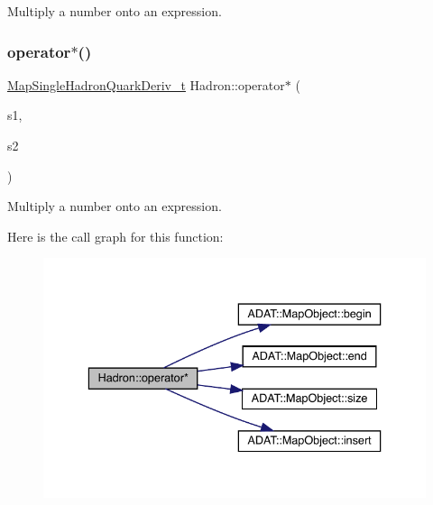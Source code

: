 Multiply a number onto an expression. 

\mbox{\label{namespaceHadron_aee77eafb416d7080a53fa0bd52528d11}} 
\subsubsection{\texorpdfstring{operator$\ast$()}{operator*()}\hspace{0.1cm}{\footnotesize\ttfamily [4/6]}}
{\footnotesize\ttfamily \mbox{\hyperlink{namespaceHadron_aa588220689caea8a6aad4d0296526e6b}{Map\+Single\+Hadron\+Quark\+Deriv\+\_\+t}} Hadron\+::operator$\ast$ (\begin{DoxyParamCaption}\item[{const std\+::complex$<$ double $>$ \&}]{s1,  }\item[{const \mbox{\hyperlink{namespaceHadron_aa588220689caea8a6aad4d0296526e6b}{Map\+Single\+Hadron\+Quark\+Deriv\+\_\+t}} \&}]{s2 }\end{DoxyParamCaption})}



Multiply a number onto an expression. 

Here is the call graph for this function\+:
\nopagebreak
\begin{figure}[H]
\begin{center}
\leavevmode
\includegraphics[width=336pt]{d1/daf/namespaceHadron_aee77eafb416d7080a53fa0bd52528d11_cgraph}
\end{center}
\end{figure}
\mbox{\label{namespaceHadron_af8f26e76a642072270a910f3326d758f}} 
